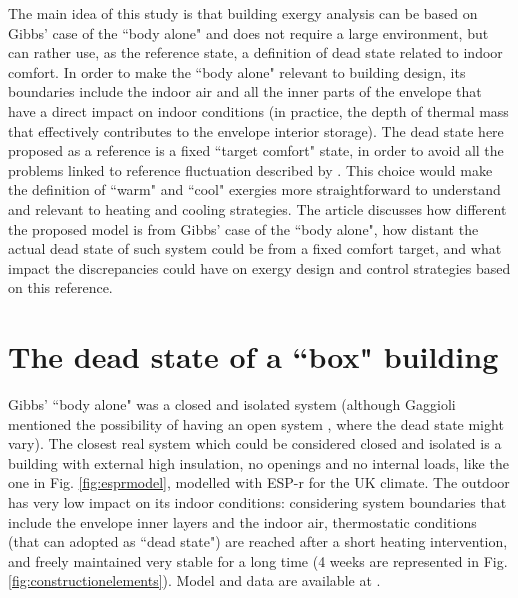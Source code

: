 \documentclass[10pt]{extarticle} %
\begin{document}
The main idea of this study is that building exergy analysis can be based on Gibbs' case of the ``body alone" and does not require a large environment, but can rather use, as the reference state, a definition of dead state related to indoor comfort. In order to make the ``body alone" relevant to building design, its boundaries include the indoor air and all the inner parts of the envelope that have a direct impact on indoor conditions (in practice, the depth of thermal mass that effectively contributes to the envelope interior storage). The dead state here proposed as a reference is a fixed ``target comfort" state, in order to avoid all the problems linked to reference fluctuation described by \cite{Pons2019}. This choice would make the definition of ``warm" and ``cool" exergies more straightforward to understand and relevant to heating and cooling strategies. The article discusses how different the proposed model is from Gibbs' case of the ``body alone", how distant the actual dead state of such system could be from a fixed comfort target, and what impact the discrepancies could have on exergy design and control strategies based on this reference.


\section{The dead state of a ``box" building} \label{subsec:simple}

Gibbs' ``body alone" was a closed and isolated system (although Gaggioli mentioned the possibility of having an open system \citep{Gaggioli1961}, where the dead state might vary). The closest real system which could be considered closed and isolated is a building with external high insulation, no openings and no internal loads, like the one in Fig. \ref{fig:esprmodel}, modelled with ESP-r for the UK climate. The outdoor has very low impact on its indoor conditions: considering system boundaries that include the envelope inner layers and the indoor air, thermostatic conditions (that can adopted as ``dead state") are reached after a short heating intervention, and freely maintained very stable for a long time (4 weeks are represented in Fig. \ref{fig:constructionelements}). Model and data are available at \cite{Bonetti2020}.
\end{document}
